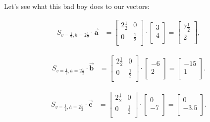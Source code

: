 Let's see what this bad boy does to our vectors:

\vspace{-.15in}
\begin{align*}
S_{v=\frac{1}{2},h=2\frac{1}{2}} \cdot \overrightarrow{\textbf{a}} &=
\begin{bmatrix}
2\frac{1}{2} & 0 \\
0 & \frac{1}{2} \\
\end{bmatrix} \cdot
\begin{bmatrix}
3 \\ 4 \\
\end{bmatrix} =
\begin{bmatrix}
7\frac{1}{2} \\ 2 \\
\end{bmatrix},
\end{align*}

\vspace{-.15in}
\begin{align*}
S_{v=\frac{1}{2},h=2\frac{1}{2}} \cdot \overrightarrow{\textbf{b}} &=
\begin{bmatrix}
2\frac{1}{2} & 0 \\
0 & \frac{1}{2} \\
\end{bmatrix} \cdot
\begin{bmatrix}
-6 \\ 2 \\
\end{bmatrix} =
\begin{bmatrix}
-15 \\ 1 \\
\end{bmatrix}.
\end{align*}

\vspace{-.15in}
\begin{align*}
S_{v=\frac{1}{2},h=2\frac{1}{2}} \cdot \overrightarrow{\textbf{c}} &=
\begin{bmatrix}
2\frac{1}{2} & 0 \\
0 & \frac{1}{2} \\
\end{bmatrix} \cdot
\begin{bmatrix}
0 \\ -7 \\
\end{bmatrix} =
\begin{bmatrix}
0 \\ -3.5 \\
\end{bmatrix}.
\end{align*}
\vspace{-.15in}

